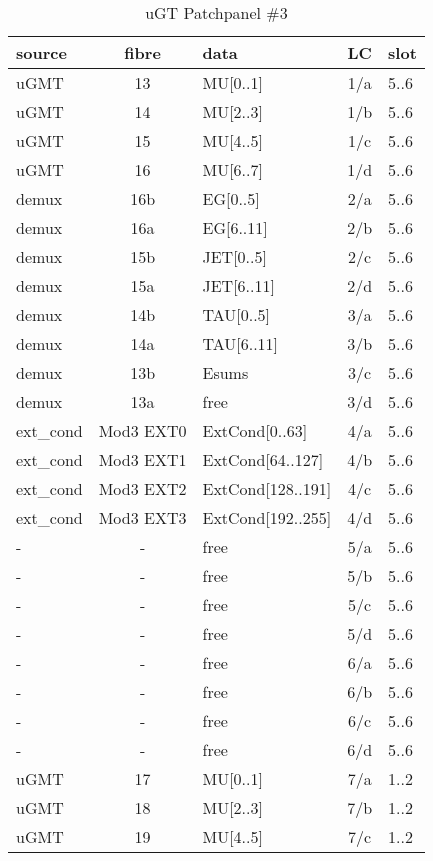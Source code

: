 \begin{longtable}{|l|c|l|c|l|}
\caption{uGT Patchpanel \#3}
    \label{tab:app:ugt_opt_pp_2}\\
\hline
\textbf{source}& \textbf{fibre}& \textbf{data}& \textbf{LC}& \textbf{slot}\\
\hline
\hline
\endhead
uGMT  & 13  & MU[0..1]   & 1/a  & 5..6 \\\hline
uGMT  & 14  & MU[2..3]   & 1/b  & 5..6 \\\hline
uGMT  & 15  & MU[4..5]   & 1/c  & 5..6 \\\hline
uGMT  & 16  & MU[6..7]   & 1/d  & 5..6 \\\hline
demux & 16b & EG[0..5]   & 2/a  & 5..6 \\\hline
demux & 16a & EG[6..11]  & 2/b  & 5..6 \\\hline
demux & 15b & JET[0..5]  & 2/c  & 5..6 \\\hline
demux & 15a & JET[6..11] & 2/d  & 5..6 \\\hline
demux & 14b & TAU[0..5]  & 3/a  & 5..6 \\\hline
demux & 14a & TAU[6..11] & 3/b  & 5..6 \\\hline
demux & 13b & Esums      & 3/c  & 5..6 \\\hline
demux & 13a & free       & 3/d  & 5..6 \\\hline
ext\_cond & Mod3 EXT0 & ExtCond[0..63]    & 4/a  & 5..6 \\\hline
ext\_cond & Mod3 EXT1 & ExtCond[64..127]  & 4/b  & 5..6 \\\hline
ext\_cond & Mod3 EXT2 & ExtCond[128..191] & 4/c  & 5..6 \\\hline
ext\_cond & Mod3 EXT3 & ExtCond[192..255] & 4/d  & 5..6 \\\hline
- & - & free & 5/a  & 5..6 \\\hline
- & - & free & 5/b  & 5..6 \\\hline
- & - & free & 5/c  & 5..6 \\\hline
- & - & free & 5/d  & 5..6 \\\hline
- & - & free & 6/a  & 5..6 \\\hline
- & - & free & 6/b  & 5..6 \\\hline
- & - & free & 6/c  & 5..6 \\\hline
- & - & free & 6/d  & 5..6 \\\hline
\hline
uGMT  & 17  & MU[0..1]   & 7/a  & 1..2 \\\hline
uGMT  & 18  & MU[2..3]   & 7/b  & 1..2 \\\hline
uGMT  & 19  & MU[4..5]   & 7/c  & 1..2 \\\hline

\end{longtable}
